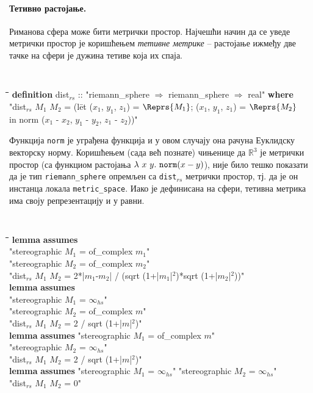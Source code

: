 \paragraph{Тетивно растојање.}
Риманова сфера може бити метрички простор. Најчешћи начин да се уведе
метрички простор је коришћењем \emph{тетивне метрике} -- растојање
ижмеђу две тачке на сфери је дужина тетиве која их спаја.  {\tt
\begin{tabbing}
\hspace{5mm}\=\hspace{5mm}\=\hspace{5mm}\=\hspace{5mm}\=\hspace{5mm}\=\kill
{\bf definition} dist$_{rs}$ :: "riemann\_sphere $\Rightarrow$ riemann\_sphere $\Rightarrow$ real" {\bf where}\\
\>  "dist$_{rs}$ $M_1$ $M_2$ = (l\=et ($x_1$, $y_1$, $z_1$) = $\Reprs{M_1}$; ($x_1$, $y_1$, $z_1$) = $\Reprs{M_2}$\\
\>\>       in norm ($x_1$ - $x_2$, $y_1$ - $y_2$, $z_1$ - $z_2$))"
\end{tabbing}
}

Функција {\tt norm} је уграђена функција и у овом случају она рачуна
Еуклидску векторску норму. Коришћењем (сада већ познате) чињенице да
$\mathbb{R}^3$ је метрички простор (са функциом растојања
$\lambda\ x\ y.\ {\tt norm}(x - y)$), није било тешко показати да је
тип {\tt riemann\_sphere} опремљен са {\tt dist$_{rs}$} метрички
простор, тј. да је он инстанца локала {\tt metric\_space}. Иако је
дефинисана на сфери, тетивна метрика има своју репрезентацију и у
равни.

{\tt
\begin{tabbing}
\hspace{2mm}\=\hspace{5mm}\=\hspace{5mm}\=\hspace{5mm}\=\hspace{5mm}\=\kill
{\bf lemma} {\bf assumes}\\
\>"stereographic $M_1$ = of\_complex $m_1$"  \\
\>"stereographic $M_2$ = of\_complex $m_2$"\\
 "dist$_{rs}$ $M_1$ $M_2$ = 2*|$m_1$-$m_2$| / (sqrt (1+|$m_1$|$^2$)*sqrt (1+|$m_2$|$^2$))"\\
{\bf lemma} {\bf assumes} \\
\>"stereographic $M_1$ = $\infty_{hs}$" \\
\>"stereographic $M_2$ = of\_complex $m$"\\
 "dist$_{rs}$ $M_1$ $M_2$ = 2 / sqrt (1+|$m$|$^2$)"\\
{\bf lemma} {\bf assumes} "stereographic $M_1$ = of\_complex $m$" \\
\>"stereographic $M_2$ = $\infty_{hs}$"\\
 "dist$_{rs}$ $M_1$ $M_2$ = 2 / sqrt (1+|$m$|$^2$)"\\
{\bf lemma} {\bf assumes} "stereographic $M_1$ = $\infty_{hs}$" "stereographic $M_2$ = $\infty_{hs}$"\\
 "dist$_{rs}$ $M_1$ $M_2$ = 0"
\end{tabbing}
}

